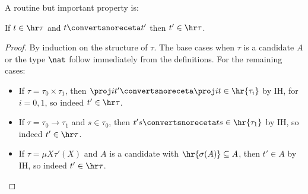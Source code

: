 A routine but important property is:
\begin{proposition}
    \label{prop:hr-closed-under-conversion}
    If $t \in \hr \tau$ and $t \convertsnoreceta t'$ then $t'\in \hr\tau$.
\end{proposition}
\begin{proof}
    By induction on the structure of $\tau$.
    The base cases when $\tau$ is a candidate $A$ or the type $\nat$ follow immediately from the definitions. For the remaining cases:
    \begin{itemize}
        \item If $\tau = \tau_0 \times \tau_1$, then $\proj i t' \convertsnoreceta \proj i t \in \hr{\tau_i}$ by IH, for $i=0,1$, so indeed $t'\in \hr \tau$.
        \item If $\tau = \tau_0 \to \tau_1$ and $s \in \tau_0$, then $t's \convertsnoreceta ts \in \hr{\tau_1}$ by IH, so indeed $t'\in \hr\tau$.
        \item If $\tau = \mu X \tau'(X)$ and $A$ is a candidate with $\hr{\sigma(A)} \subseteq A$, then $t' \in A$ by IH, so indeed $t'\in \hr\tau$.\qedhere
    \end{itemize}
\end{proof}


